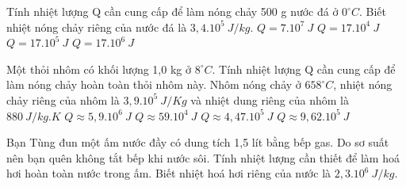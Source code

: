 \begin{vidu}%
	Tính nhiệt lượng Q cần cung cấp để làm nóng chảy 500 g nước đá ở $0^\circ C$. Biết nhiệt nóng chảy riêng của nước đá là $3,4.10^5\ J/kg$.
	\choice
	{$Q=7.10^7\ J$}
	{\True $Q=17.10^4\ J$}
	{$Q=17.10^5\ J$}
	{$Q=17.10^6\ J$}
\end{vidu}

\begin{vidu}%
	Một thỏi nhôm có khối lượng 1,0 kg ở $8^\circ C$. Tính nhiệt lượng Q cần cung cấp để làm nóng chảy hoàn toàn thỏi nhôm này. Nhôm nóng chảy ở $658^\circ C$, nhiệt nóng chảy riêng của nhôm là $3,9.10^5\ J/Kg$ và nhiệt dung riêng của nhôm là $880\ J/kg.K$
	\choice
	{$Q\approx 5,9.10^6\ J$}
	{$Q\approx 59.10^4\ J$}
	{$Q\approx 4,47.10^5\ J$}
	{\True $Q\approx 9,62.10^5\ J$}
\end{vidu}

\begin{vidu}
	Bạn Tùng đun một ấm nước đầy có dung tích 1,5 lít bằng bếp gas. Do sơ suất nên bạn quên không tắt bếp khi nước sôi. Tính nhiệt lượng cần thiết để làm hoá hơi hoàn toàn nước trong ấm. Biết nhiệt hoá hơi riêng của nước là $2,3.10^6\ J/kg$.
	\loigiai{
		\begin{itemize}
			\item 
			\item 
			\item 
			\item 
			\item 
			\item 
		\end{itemize}
	}
\end{vidu}

